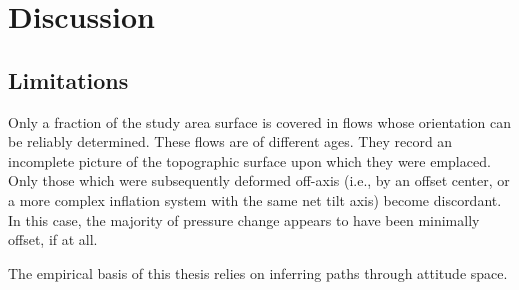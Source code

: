 \chapter{Discussion}\label{cha:discussion}

\section{Limitations}

Only a fraction of the study area surface is covered in flows whose orientation can be reliably determined. These flows are of different ages. They record an incomplete picture of the topographic surface upon which they were emplaced. Only those which were subsequently deformed off-axis (i.e., by an offset center, or a more complex inflation system with the same net tilt axis) become discordant. In this case, the majority of pressure change appears to have been minimally offset, if at all.

The empirical basis of this thesis relies on inferring paths through attitude space.


